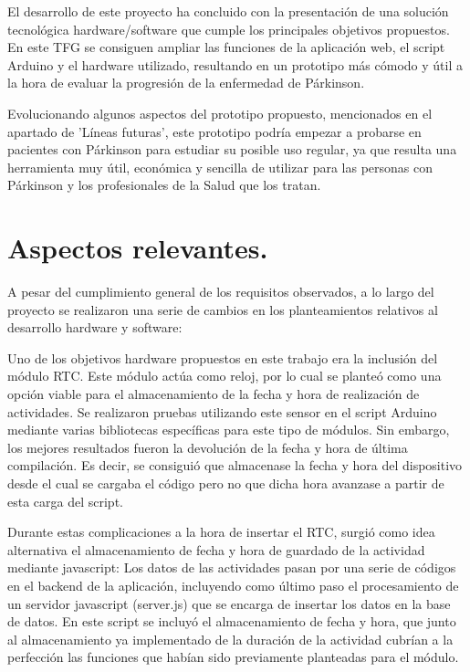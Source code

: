 El desarrollo de este proyecto ha concluido con la presentación de una solución tecnológica hardware/software que cumple los principales objetivos propuestos. En este TFG se consiguen ampliar las funciones de la aplicación web, el script Arduino y el hardware utilizado, resultando en un prototipo más cómodo y útil a la hora de evaluar la progresión de la enfermedad de Párkinson.

Evolucionando algunos aspectos del prototipo propuesto, mencionados en el apartado de 'Líneas futuras', este prototipo podría empezar a probarse en pacientes con Párkinson para estudiar su posible uso regular, ya que resulta una herramienta muy útil, económica y sencilla de utilizar para las personas con Párkinson y los profesionales de la Salud que los tratan.

\section{Aspectos relevantes.}
A pesar del cumplimiento general de los requisitos observados, a lo largo del proyecto se realizaron una serie de cambios en los planteamientos relativos al desarrollo hardware y software:

Uno de los objetivos hardware propuestos en este trabajo era la inclusión del módulo RTC. Este módulo actúa como reloj, por lo cual se planteó como una opción viable para el almacenamiento de la fecha y hora de realización de actividades. Se realizaron pruebas utilizando este sensor en el script Arduino mediante varias bibliotecas específicas para este tipo de módulos. Sin embargo, los mejores resultados fueron la devolución de la fecha y hora de última compilación. Es decir, se consiguió que almacenase la fecha y hora del dispositivo desde el cual se cargaba el código pero no que dicha hora avanzase a partir de esta carga del script.

Durante estas complicaciones a la hora de insertar el RTC, surgió como idea alternativa el almacenamiento de fecha y hora de guardado de la actividad mediante javascript: Los datos de las actividades pasan por una serie de códigos en el backend de la aplicación, incluyendo como último paso el procesamiento de un servidor javascript (server.js) que se encarga de insertar los datos en la base de datos. En este script se incluyó el almacenamiento de fecha y hora, que junto al almacenamiento ya implementado de la duración de la actividad cubrían a la perfección las funciones que habían sido previamente planteadas para el módulo.

